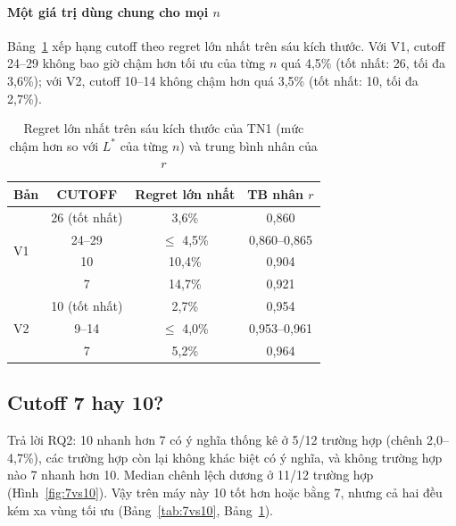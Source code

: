 \documentclass[11pt,a4paper]{article}
\begin{document}
\paragraph{Một giá trị dùng chung cho mọi $n$}
Bảng~\ref{tab:robust} xếp hạng cutoff theo regret lớn nhất trên sáu kích thước. Với V1, cutoff 24--29 không bao giờ
chậm hơn tối ưu của từng $n$ quá 4,5\% (tốt nhất: 26, tối đa 3,6\%); với V2, cutoff 10--14 không chậm hơn quá 3,5\%
(tốt nhất: 10, tối đa 2,7\%).

\begin{table}[H]
\centering
\small
\setlength{\tabcolsep}{4pt}
\begin{tabular}{lccc}
\toprule
Bản & CUTOFF & Regret lớn nhất & TB nhân $r$ \\
\midrule
\multirow{4}{*}{V1} & 26 (tốt nhất) & 3,6\% & 0,860 \\
                    & 24--29        & $\le$ 4,5\% & 0,860--0,865 \\
                    & 10            & 10,4\% & 0,904 \\
                    & 7             & 14,7\% & 0,921 \\
\midrule
\multirow{3}{*}{V2} & 10 (tốt nhất) & 2,7\% & 0,954 \\
                    & 9--14         & $\le$ 4,0\% & 0,953--0,961 \\
                    & 7             & 5,2\% & 0,964 \\
\bottomrule
\end{tabular}
\caption{Regret lớn nhất trên sáu kích thước của TN1 (mức chậm hơn so với $L^*$ của từng $n$) và trung bình nhân của $r$}
\label{tab:robust}
\end{table}

\subsection{Cutoff 7 hay 10?}
Trả lời RQ2: 10 nhanh hơn 7 có ý nghĩa thống kê ở 5/12 trường hợp (chênh 2,0--4,7\%), các trường hợp còn lại không
khác biệt có ý nghĩa, và không trường hợp nào 7 nhanh hơn 10. Median chênh lệch dương ở 11/12 trường hợp
(Hình~\ref{fig:7vs10}). Vậy trên máy này 10 tốt hơn hoặc bằng 7, nhưng cả hai đều kém xa vùng tối ưu
(Bảng~\ref{tab:7vs10}, Bảng~\ref{tab:robust}).
\end{document}
